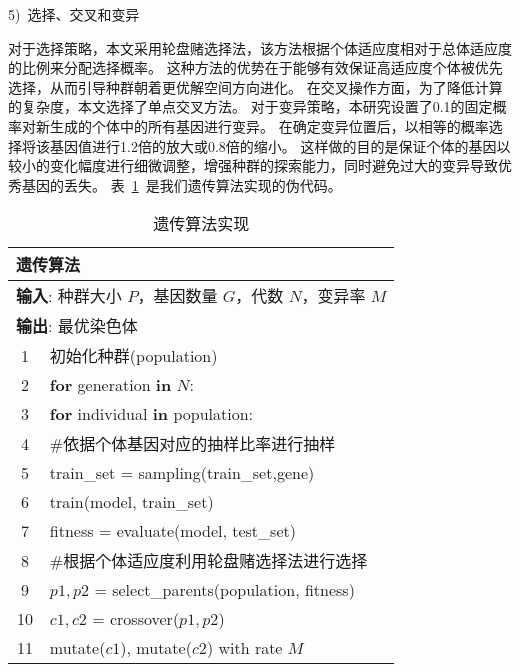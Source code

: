 5)~选择、交叉和变异\par
对于选择策略，本文采用轮盘赌选择法，该方法根据个体适应度相对于总体适应度的比例来分配选择概率。
这种方法的优势在于能够有效保证高适应度个体被优先选择，从而引导种群朝着更优解空间方向进化。
在交叉操作方面，为了降低计算的复杂度，本文选择了单点交叉方法。
对于变异策略，本研究设置了0.1的固定概率对新生成的个体中的所有基因进行变异。
在确定变异位置后，以相等的概率选择将该基因值进行1.2倍的放大或0.8倍的缩小。
这样做的目的是保证个体的基因以较小的变化幅度进行细微调整，增强种群的探索能力，同时避免过大的变异导致优秀基因的丢失。
表~\ref{tab:genetic_algorithm}~是我们遗传算法实现的伪代码。
\begin{table}[h]
	\caption{遗传算法实现}
	\label{tab:genetic_algorithm}
	\centering
	\begin{tabularx}{1.0\textwidth}{cl}
		\toprule
		\multicolumn{2}{l}{\textbf{遗传算法}}                                               \\
		\midrule
		\multicolumn{2}{l}{\textbf{输入}: 种群大小 $P$，基因数量 $G$，代数 $N$，变异率 $M$} \\
		\multicolumn{2}{l}{\textbf{输出}: 最优染色体}                                       \\
		1  & 初始化种群(population)                                                         \\
		2  & \textbf{for} generation \textbf{in} $N$:                                       \\
		3  & \quad \textbf{for} individual \textbf{in} population:                          \\
		4  & \quad\quad \#依据个体基因对应的抽样比率进行抽样                                \\
		5  & \quad\quad train\_set = sampling(train\_set,gene)                              \\
		6  & \quad\quad train(model, train\_set)                                            \\
		7  & \quad\quad fitness = evaluate(model, test\_set)                                \\
		8  & \quad \#根据个体适应度利用轮盘赌选择法进行选择                                 \\
		9  & \quad $p1, p2$ = select\_parents(population, fitness)                          \\
		10 & \quad $c1, c2$ = crossover($p1, p2$)                                           \\
		11 & \quad mutate($c1$), mutate($c2$) with rate $M$                                 \\

\end{tabularx}
\end{table}
